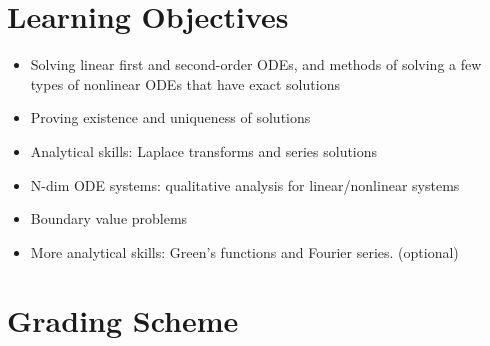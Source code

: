 \documentclass[letterpaper]{inzane_syllabus} %
\begin{document}



\vspace{0.5cm}
\section{Learning Objectives}
\begin{itemize}
\item Solving linear first and second-order ODEs, and methods of solving a few types of nonlinear ODEs that have exact solutions
\item Proving existence and uniqueness of solutions
\item Analytical skills: Laplace transforms and series solutions
\item N-dim ODE systems: qualitative analysis for linear/nonlinear systems
\item Boundary value problems
\item More analytical skills: Green's functions and Fourier series. (optional)

\end{itemize}

\vspace{0.5cm}
\section{Grading Scheme}

\begin{twentyshort}
\end{twentyshort}
\end{document}
